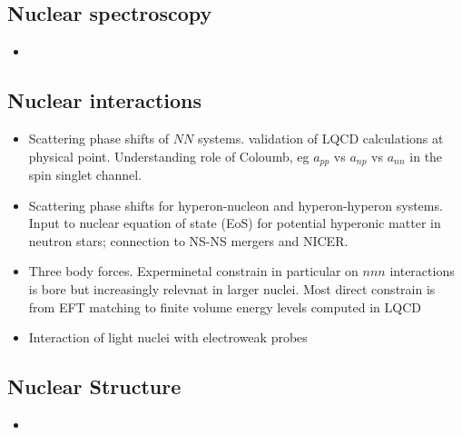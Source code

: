 
 


\subsection{Nuclear spectroscopy}

\begin{itemize}
	\item 
\end{itemize}




\subsection{Nuclear interactions}

\begin{itemize}
	\item Scattering  phase shifts of $NN$ systems. validation of LQCD calculations at physical point. Understanding role of Coloumb, eg $a_{pp}$ vs $a_{np}$ vs $a_{nn}$ in the spin singlet channel.
	\item Scattering phase shifts for  hyperon-nucleon and hyperon-hyperon systems. Input to nuclear equation of state (EoS) for potential hyperonic matter in neutron stars; connection to NS-NS mergers and NICER.
	\item Three body forces. Experminetal constrain in particular on $nnn$ interactions is bore but increasingly relevnat in larger nuclei. Most direct constrain is from EFT matching to finite volume energy levels computed in LQCD
	\item Interaction of light nuclei with electroweak probes
\end{itemize}


\subsection{Nuclear Structure}

\begin{itemize}
	\item 
\end{itemize}



